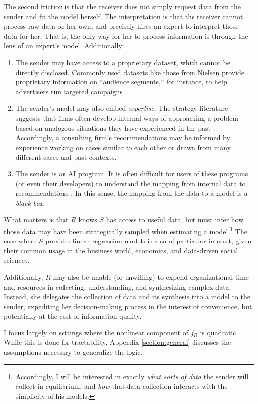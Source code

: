 \documentclass[11pt,dvipsnames]{article}
\begin{document}
The second friction is that the receiver does not simply request data from the sender and fit the model herself. The interpretation is that the receiver cannot process raw data on her own, and precisely hires an expert to interpret those data for her. That is, the only way for her to process information is through the lens of an expert's model. Additionally:
\begin{enumerate}
\item The sender may have access to a proprietary dataset, which cannot be directly disclosed. Commonly used datasets like those from Nielsen provide proprietary information on ``audience segments,'' for instance, to help advertisers run targeted campaigns \citep{nielsen2024audiencesegments}.
\item The sender's model may also embed \emph{expertise}. The strategy literature suggests that firms often develop internal ways of approaching a problem based on analogous situations they have experienced in the past \citep{carroll2024strategy}. Accordingly, a consulting firm's recommendations may be informed by experience working on cases similar to each other or drawn from many different cases and past contexts.
\item The sender is an AI program. It is often difficult for users of these programs (or even their developers) to understand the mapping from internal data to recommendations \citep{zuccarelli2024blackbox}. In this sense, the mapping from the data to a model is a \emph{black box}.
\end{enumerate}
What matters is that $R$ knows $S$ has access to useful data, but must infer how those data may have been strategically sampled when estimating a model.\footnote{
Accordingly, I will be interested in exactly \emph{what sorts of data} the sender will collect in equilibrium, and \emph{how} that data collection interacts with the simplicity of his models.}
The case where $S$ provides linear regression models is also of particular interest, given their common usage in the business world, economics, and data-driven social sciences.

Additionally, $R$ may also be unable (or unwilling) to expend organizational time and resources in collecting, understanding, and synthesizing complex data.
Instead, she delegates the collection of data and its synthesis into a model to the sender, expediting her decision-making process in the interest of convenience, but potentially at the cost of information quality.


I focus largely on settings where the nonlinear component of $f_R$ is quadratic. While this is done for tractability, Appendix \ref{section:general} discusses the assumptions necessary to generalize the logic.
\end{document}
